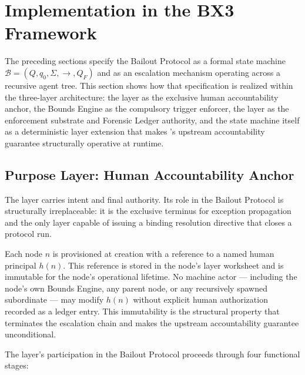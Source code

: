 \section{Implementation in the BX3 Framework}\label{sec:bailout-impl}

The preceding sections specify the Bailout Protocol as a formal state machine $\mathcal{B} = (Q, q_0, \Sigma, \rightarrow, Q_F)$ and as an escalation mechanism operating across a recursive agent tree. This section shows how that specification is realized within the \bxthree{} three-layer architecture: the \purpose{} layer as the exclusive human accountability anchor, the Bounds Engine as the compulsory trigger enforcer, the \fact{} layer as the enforcement substrate and Forensic Ledger authority, and the state machine itself as a deterministic \fact{} layer extension that makes \bxthree{}'s upstream accountability guarantee structurally operative at runtime.

\subsection{Purpose Layer: Human Accountability Anchor}\label{sec:bailout-purpose}

The \purpose{} layer carries intent and final authority. Its role in the Bailout Protocol is structurally irreplaceable: it is the exclusive terminus for exception propagation and the only layer capable of issuing a binding resolution directive that closes a protocol run.

Each \bxthree{} node $n$ is provisioned at creation with a reference to a named human principal $h(n)$. This reference is stored in the node's \purpose{} layer worksheet and is immutable for the node's operational lifetime. No machine actor --- including the node's own Bounds Engine, any parent node, or any recursively spawned subordinate --- may modify $h(n)$ without explicit human authorization recorded as a ledger entry. This immutability is the structural property that terminates the escalation chain and makes the upstream accountability guarantee unconditional.

The \purpose{} layer's participation in the Bailout Protocol proceeds through four functional stages:

